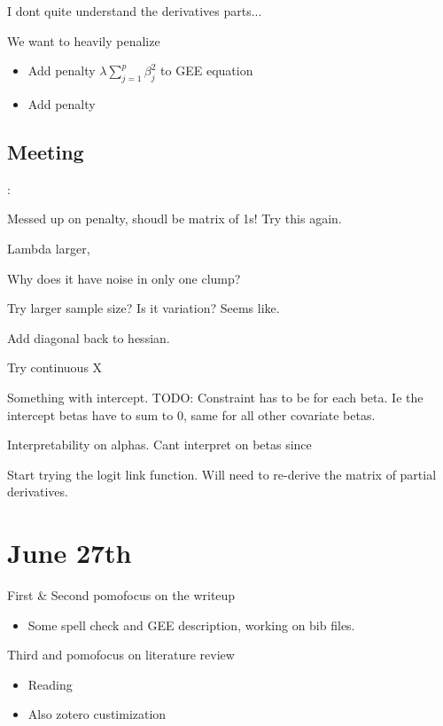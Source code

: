 \documentclass[10pt]{article}
\newcommand{\cmark}{\ding{51}}%
\newcommand{\done}{\rlap{$\square$}{\raisebox{2pt}{\large\hspace{1pt}\cmark}}%
\hspace{-2.5pt}}
\theoremstyle{definition}
\begin{document}
I dont quite understand the derivatives parts...

We want to heavily penalize

\begin{itemize}
  \item Add penalty $\lambda \sum_{j = 1}^p \beta_j^2$ to GEE equation
  \item Add penalty
\end{itemize}

\subsection{Meeting}:

Messed up on penalty, shoudl be matrix of 1s! Try this again.

Lambda larger,

Why does it have noise in only one clump?

Try larger sample size? Is it variation? Seems like.

Add diagonal back to hessian.

Try continuous X

Something with intercept.
TODO: Constraint has to be for each beta. Ie the intercept betas have to sum to 0, same for all other covariate betas.


Interpretability on alphas. Cant interpret on betas since


Start trying the logit link function. Will need to re-derive the matrix of partial derivatives.



\newpage
\section{June 27th}

\begin{todolist}
  \item[\done] First \& Second pomofocus on the writeup
  \begin{itemize}
    \item Some spell check and GEE description, working on bib files.
  \end{itemize}
  \item Third and pomofocus on literature review
  \begin{itemize}
    \item Reading \cite{luna2020}
    \item Also zotero custimization
  \end{itemize}
\end{todolist}
\end{document}
